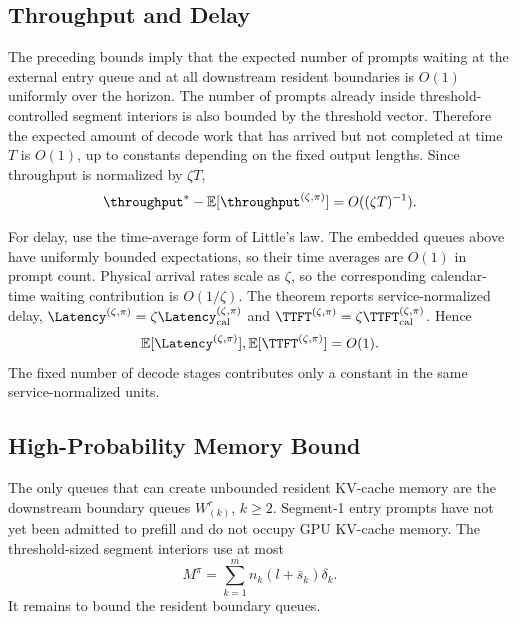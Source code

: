 \subsection{Throughput and Delay}

The preceding bounds imply that the expected number of prompts waiting at the external entry queue and at all downstream resident boundaries is \(O(1)\) uniformly over the horizon. The number of prompts already inside threshold-controlled segment interiors is also bounded by the threshold vector. Therefore the expected amount of decode work that has arrived but not completed at time \(T\) is \(O(1)\), up to constants depending on the fixed output lengths. Since throughput is normalized by \(\zeta T\),
\[
    \throughput^*-\mathbb{E}[\throughput^{(\zeta,\pi)}]
    =
    O((\zeta T)^{-1}).
\]

For delay, use the time-average form of Little's law. The embedded queues above have uniformly bounded expectations, so their time averages are \(O(1)\) in prompt count. Physical arrival rates scale as \(\zeta\), so the corresponding calendar-time waiting contribution is \(O(1/\zeta)\). The theorem reports service-normalized delay, \(\Latency^{(\zeta,\pi)}=\zeta\Latency_{\rm cal}^{(\zeta,\pi)}\) and \(\TTFT^{(\zeta,\pi)}=\zeta\TTFT_{\rm cal}^{(\zeta,\pi)}\). Hence
\[
    \mathbb{E}[\Latency^{(\zeta,\pi)}],
    \mathbb{E}[\TTFT^{(\zeta,\pi)}]
    =
    O(1).
\]
The fixed number of decode stages contributes only a constant in the same service-normalized units.

\subsection{High-Probability Memory Bound}

The only queues that can create unbounded resident KV-cache memory are the downstream boundary queues \(W^r_{(k)}\), \(k\ge2\). Segment-1 entry prompts have not yet been admitted to prefill and do not occupy GPU KV-cache memory. The threshold-sized segment interiors use at most
\[
    M^\pi=\sum_{k=1}^m n_k(l+\bar s_k)\delta_k.
\]
It remains to bound the resident boundary queues.

